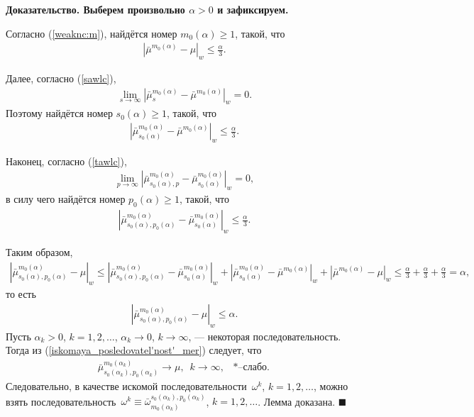\documentclass{report}
\newenvironment{Proof}{\par\noindent\bf Доказательство.\rm}{ $\blacksquare$\par}
\begin{document}
\begin{Proof}
Выберем произвольно $\alpha>0$ и зафиксируем.

Согласно (\ref{weaknc:m}), найдётся номер $m_0(\alpha)\geqslant1$, такой, что
\begin{gather*}
|\bar{\mu}^{m_0(\alpha)}-\mu|_w\leqslant\frac\alpha3.
\end{gather*}

Далее, согласно (\ref{sawlc}),
\begin{gather*}
\lim\limits_{s\to\infty}|\bar{\mu}^{m_0(\alpha)}_s-\bar\mu^{m_0(\alpha)}|_w=0.
\end{gather*}
Поэтому найдётся номер $s_0(\alpha)\geqslant1$, такой, что
\begin{gather*}
|\bar{\mu}^{m_0(\alpha)}_{s_0(\alpha)}-\bar\mu^{m_0(\alpha)}|_w\leqslant\frac\alpha3.
\end{gather*}

Наконец, согласно (\ref{tawlc}),
\begin{gather*}
\lim\limits_{p\to\infty}|\bar{\mu}^{m_0(\alpha)}_{s_0(\alpha),p}-\bar\mu^{m_0(\alpha)}_{s_0(\alpha)}|_w=0,
\end{gather*}
в силу чего найдётся номер $p_0(\alpha)\geqslant1$, такой, что
\begin{gather*}
|\bar{\mu}^{m_0(\alpha)}_{s_0(\alpha),p_0(\alpha)}-\bar\mu^{m_0(\alpha)}_{s_0(\alpha)}|_w\leqslant\frac\alpha3.
\end{gather*}

Таким образом,
\begin{gather*}
|\bar{\mu}^{m_0(\alpha)}_{s_0(\alpha),p_0(\alpha)}-\mu|_w\leqslant |\bar{\mu}^{m_0(\alpha)}_{s_0(\alpha),p_0(\alpha)}-\bar\mu^{m_0(\alpha)}_{s_0(\alpha)}|_w+
|\bar{\mu}^{m_0(\alpha)}_{s_0(\alpha)}-\bar\mu^{m_0(\alpha)}|_w+|\bar{\mu}^{m_0(\alpha)}-\mu|_w\leqslant \frac\alpha3+\frac\alpha3+\frac\alpha3=\alpha,
\end{gather*}
то есть
\begin{gather}\label{iskomaya_posledovatel'nost'_mer}
|\bar{\mu}^{m_0(\alpha)}_{s_0(\alpha),p_0(\alpha)}-\mu|_w\leqslant\alpha.
\end{gather}
Пусть $\alpha_k>0$, $k=1,2,\dots$, $\alpha_k\to0$, $k\to\infty$, --- некоторая последовательность. Тогда из (\ref{iskomaya_posledovatel'nost'_mer}) следует, что
\begin{gather*}
\bar{\mu}^{m_0(\alpha_k)}_{s_0(\alpha_k),p_0(\alpha_k)}\to\mu,\,\,\,k\to\infty,\text{ $*$--слабо.}
\end{gather*}
Следовательно, в качестве искомой последовательности~$\omega^k$, $k=1,2,\dots$, можно взять последовательность~$\omega^k\equiv\bar\omega_{m_0(\alpha_k)}^{s_0(\alpha_k),p_0(\alpha_k)}$,
$k=1,2,\dots$. Лемма доказана.
\end{Proof}
\end{document}

